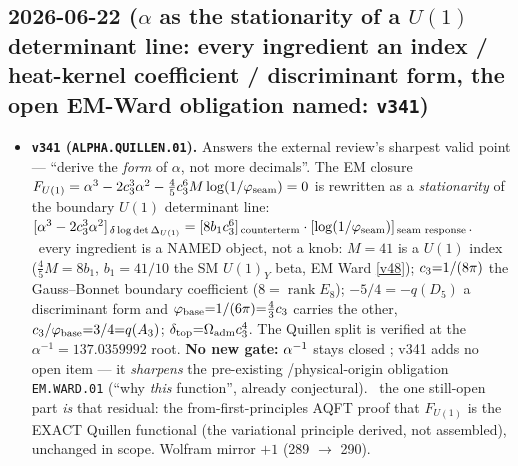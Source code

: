 \subsection*{2026-06-22 ($\alpha$ as the stationarity of a $U(1)$ determinant line: every ingredient an index / heat-kernel coefficient / discriminant form, the open EM-Ward obligation named: \texttt{v341})}
\begin{itemize}
\item \textbf{\texttt{v341} (\texttt{ALPHA.QUILLEN.01}).} Answers the external review's sharpest valid point ---
``derive the \emph{form} of $\alpha$, not more decimals''. The EM closure
$F_{U(1)}=\alpha^3-2c_3^3\alpha^2-\tfrac45c_3^6 M\log(1/\varphi_{\mathrm{seam}})=0$ is rewritten as a
\emph{stationarity} of the boundary $U(1)$ determinant line:
$[\alpha^3-2c_3^3\alpha^2]_{\,\delta\log\det\Delta_{U(1)}}=[8b_1c_3^6]_{\,\text{counterterm}}\cdot
[\log(1/\varphi_{\mathrm{seam}})]_{\,\text{seam response}}$. \mE\ every ingredient is a NAMED object, not a knob:
$M{=}41$ is a $U(1)$ index ($\tfrac45 M=8b_1$, $b_1{=}41/10$ the SM $U(1)_Y$ beta, EM Ward \vref{v48});
$c_3{=}1/(8\pi)$ the Gauss--Bonnet boundary coefficient ($8{=}\operatorname{rank}E_8$); $-5/4=-q(D_5)$ a
discriminant form and $\varphi_{\mathrm{base}}{=}1/(6\pi){=}\tfrac43c_3$ carries the other,
$c_3/\varphi_{\mathrm{base}}{=}3/4{=}q(A_3)$; $\delta_{\mathrm{top}}{=}\Omega_{\mathrm{adm}}c_3^4$. The
Quillen split is verified at the $\alpha^{-1}{=}137.0359992$ root. \textbf{No new gate:} $\alpha^{-1}$ stays closed
\mE; v341 adds no open item --- it \emph{sharpens} the pre-existing \mO/physical-origin obligation
\texttt{EM.WARD.01} (``why \emph{this} function'', already conjectural). \mO\ the one still-open part \emph{is} that
residual: the from-first-principles AQFT proof that $F_{U(1)}$ is the EXACT Quillen functional (the variational
principle derived, not assembled), unchanged in scope. Wolfram mirror $+1$ (289 $\to$ 290).
\end{itemize}

